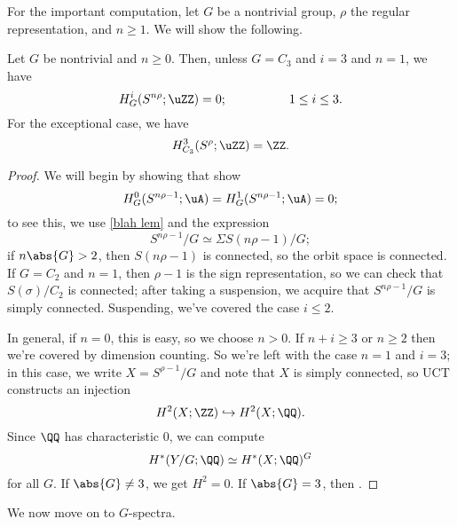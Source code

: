 For the important computation, let $G$ be a nontrivial group, $\rho$ the regular representation, and $n \geq 1$.
We will show the following.
\begin{proposition}
  Let $G$ be nontrivial and $n \geq 0$.
  Then, unless $G = C_3$ and $i = 3$ and $n = 1$, we have
  \[
    H_G^i(S^{n\rho};\uZZ) = 0; \hspace{50pt} 1 \leq i \leq 3.
  \]
  For the exceptional case, we have
  \[
    H_{C_3}^3(S^\rho;\uZZ) = \ZZ.
  \]
\end{proposition}
\begin{proof}
  We will begin by showing that show 
  \[
    H^0_G(S^{n\rho - 1};\uA) = H_G^1(S^{n\rho - 1};\uA) = 0;
  \]
  to see this, we use \cref{blah lem} and the expression
  \[
    S^{n\rho-1}/G \simeq \Sigma S(n\rho - 1)/G;
  \]
  if $n\abs{G} > 2$, then $S(n\rho - 1)$ is connected, so the orbit space is connected.
  If $G = C_2$ and $n = 1$, then $\rho - 1$ is the sign representation, so we can check that $S(\sigma)/C_2$ is connected;
  after taking a suspension, we acquire that $S^{n\rho - 1}/G$ is simply connected.
  Suspending, we've covered the case $i \leq 2$.

  In general, if $n = 0$, this is easy, so we choose $n > 0$.
  If $n + i \geq 3$ or $n \geq 2$ then we're covered by dimension counting.
  So we're left with the case $n = 1$ and $i = 3$;
  in this case, we write $X = S^{\rho - 1}/G$ and note that $X$ is simply connected, so UCT constructs an injection
  \[
    H^2(X;\ZZ) \hookrightarrow H^2(X;\QQ).
  \]
  Since $\QQ$ has characteristic 0, we can compute
  \[
    H^*(Y/G;\QQ) \simeq H^*(X;\QQ)^G 
  \]
  for all $G$.
  If $\abs{G} \neq 3$, we get $H^2 = 0$.
  If $\abs{G} = 3$, then .
\end{proof}

We now move on to $G$-spectra.

